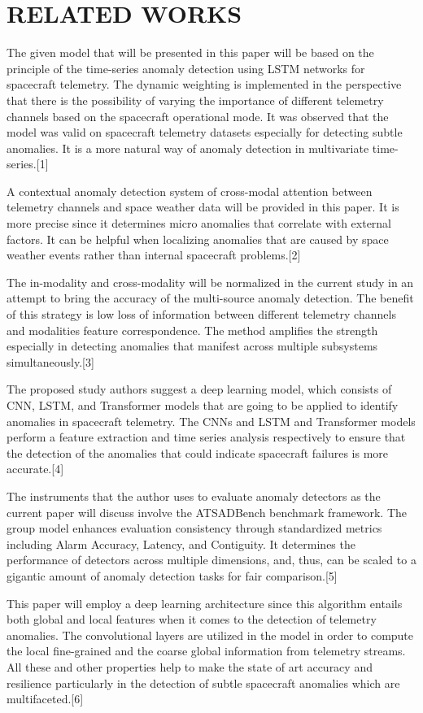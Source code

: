 \documentclass[conference]{IEEEtran}
\begin{document}
\section{RELATED WORKS}

The given model that will be presented in this paper will be based on the principle of the time-series anomaly detection using LSTM networks for spacecraft telemetry. The dynamic weighting is implemented in the perspective that there is the possibility of varying the importance of different telemetry channels based on the spacecraft operational mode. It was observed that the model was valid on spacecraft telemetry datasets especially for detecting subtle anomalies. It is a more natural way of anomaly detection in multivariate time-series.[1]

A contextual anomaly detection system of cross-modal attention between telemetry channels and space weather data will be provided in this paper. It is more precise since it determines micro anomalies that correlate with external factors. It can be helpful when localizing anomalies that are caused by space weather events rather than internal spacecraft problems.[2]

The in-modality and cross-modality will be normalized in the current study in an attempt to bring the accuracy of the multi-source anomaly detection. The benefit of this strategy is low loss of information between different telemetry channels and modalities feature correspondence. The method amplifies the strength especially in detecting anomalies that manifest across multiple subsystems simultaneously.[3]

The proposed study authors suggest a deep learning model, which consists of CNN, LSTM, and Transformer models that are going to be applied to identify anomalies in spacecraft telemetry. The CNNs and LSTM and Transformer models perform a feature extraction and time series analysis respectively to ensure that the detection of the anomalies that could indicate spacecraft failures is more accurate.[4]

The instruments that the author uses to evaluate anomaly detectors as the current paper will discuss involve the ATSADBench benchmark framework. The group model enhances evaluation consistency through standardized metrics including Alarm Accuracy, Latency, and Contiguity. It determines the performance of detectors across multiple dimensions, and, thus, can be scaled to a gigantic amount of anomaly detection tasks for fair comparison.[5]

This paper will employ a deep learning architecture since this algorithm entails both global and local features when it comes to the detection of telemetry anomalies. The convolutional layers are utilized in the model in order to compute the local fine-grained and the coarse global information from telemetry streams. All these and other properties help to make the state of art accuracy and resilience particularly in the detection of subtle spacecraft anomalies which are multifaceted.[6]
\end{document}
